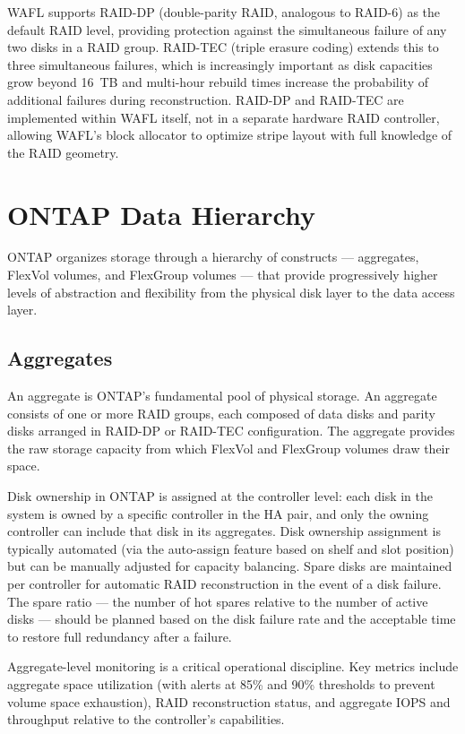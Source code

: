 WAFL supports RAID-DP (double-parity RAID, analogous to RAID-6) as the default RAID level, providing protection against the simultaneous failure of any two disks in a RAID group. RAID-TEC (triple erasure coding) extends this to three simultaneous failures, which is increasingly important as disk capacities grow beyond 16~TB and multi-hour rebuild times increase the probability of additional failures during reconstruction. RAID-DP and RAID-TEC are implemented within WAFL itself, not in a separate hardware RAID controller, allowing WAFL's block allocator to optimize stripe layout with full knowledge of the RAID geometry.

\section{ONTAP Data Hierarchy}

ONTAP organizes storage through a hierarchy of constructs --- aggregates, FlexVol volumes, and FlexGroup volumes --- that provide progressively higher levels of abstraction and flexibility from the physical disk layer to the data access layer.

\subsection{Aggregates}

An aggregate is ONTAP's fundamental pool of physical storage. An aggregate consists of one or more RAID groups, each composed of data disks and parity disks arranged in RAID-DP or RAID-TEC configuration. The aggregate provides the raw storage capacity from which FlexVol and FlexGroup volumes draw their space.

Disk ownership in ONTAP is assigned at the controller level: each disk in the system is owned by a specific controller in the HA pair, and only the owning controller can include that disk in its aggregates. Disk ownership assignment is typically automated (via the auto-assign feature based on shelf and slot position) but can be manually adjusted for capacity balancing. Spare disks are maintained per controller for automatic RAID reconstruction in the event of a disk failure. The spare ratio --- the number of hot spares relative to the number of active disks --- should be planned based on the disk failure rate and the acceptable time to restore full redundancy after a failure.

Aggregate-level monitoring is a critical operational discipline. Key metrics include aggregate space utilization (with alerts at 85\% and 90\% thresholds to prevent volume space exhaustion), RAID reconstruction status, and aggregate IOPS and throughput relative to the controller's capabilities.

